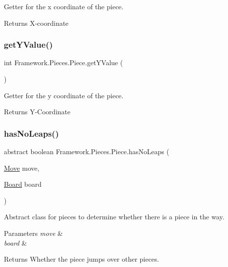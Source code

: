 Getter for the x coordinate of the piece. \begin{DoxyReturn}{Returns}
X-\/coordinate 
\end{DoxyReturn}
\hypertarget{class_framework_1_1_pieces_1_1_piece_a2c82ab150512df66e2e970f4a67553a0}{}\label{class_framework_1_1_pieces_1_1_piece_a2c82ab150512df66e2e970f4a67553a0} 
\subsubsection{\texorpdfstring{get\+Y\+Value()}{getYValue()}}
{\footnotesize\ttfamily int Framework.\+Pieces.\+Piece.\+get\+Y\+Value (\begin{DoxyParamCaption}{ }\end{DoxyParamCaption})}

Getter for the y coordinate of the piece. \begin{DoxyReturn}{Returns}
Y-\/\+Coordinate 
\end{DoxyReturn}
\hypertarget{class_framework_1_1_pieces_1_1_piece_a6a7d6f6cf39ebc83927c5f3912163191}{}\label{class_framework_1_1_pieces_1_1_piece_a6a7d6f6cf39ebc83927c5f3912163191} 
\subsubsection{\texorpdfstring{has\+No\+Leaps()}{hasNoLeaps()}}
{\footnotesize\ttfamily abstract boolean Framework.\+Pieces.\+Piece.\+has\+No\+Leaps (\begin{DoxyParamCaption}\item[{\hyperlink{class_framework_1_1_move}{Move}}]{move,  }\item[{\hyperlink{class_framework_1_1_board}{Board}}]{board }\end{DoxyParamCaption})\hspace{0.3cm}{\ttfamily [abstract]}}

Abstract class for pieces to determine whether there is a piece in the way. 
\begin{DoxyParams}{Parameters}
{\em move} & \\
\hline
{\em board} & \\
\hline
\end{DoxyParams}
\begin{DoxyReturn}{Returns}
Whether the piece jumps over other pieces. 
\end{DoxyReturn}
\hypertarget{class_framework_1_1_pieces_1_1_piece_afefa777905d65bca60e0954386549b84}{}\label{class_framework_1_1_pieces_1_1_piece_afefa777905d65bca60e0954386549b84} 

